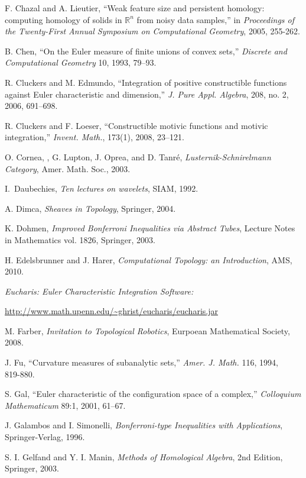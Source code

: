 \documentclass{psapm-l}
\theoremstyle{definition}
\theoremstyle{remark}
\numberwithin{equation}{section}
\begin{document}
{\begin{thebibliography}{A}
 F. Chazal and A. Lieutier, ``Weak feature size and persistent homology: computing homology of solids in ${{\mathbb R}}^n$ from noisy data samples,'' in {\em Proceedings of the Twenty-First Annual Symposium on Computational Geometry}, 2005, 255-262.

 B. Chen, ``On the Euler measure of finite unions of convex sets,'' {\em Discrete and Computational Geometry} 10, 1993, 79--93.

 R. Cluckers and M. Edmundo, ``Integration of positive constructible functions against Euler characteristic and dimension,'' {\em J. Pure Appl. Algebra}, 208, no. 2, 2006, 691--698.

 R. Cluckers and F. Loeser, ``Constructible motivic functions and motivic integration,'' {\em Invent. Math.}, 173(1), 2008, 23--121.

 O. Cornea, , G. Lupton, J. Oprea, and D. Tanr\'e, {\em Lusternik-Schnirelmann Category}, Amer. Math. Soc., 2003.

 I.~Daubechies, \emph{Ten lectures on wavelets}, SIAM, 1992.

 A. Dimca, {\em Sheaves in Topology}, Springer, 2004.

 K. Dohmen, {\em Improved Bonferroni Inequalities via Abstract Tubes}, Lecture Notes in Mathematics vol. 1826, Springer, 2003.

 H. Edelsbrunner and J. Harer, {\em Computational Topology: an Introduction}, AMS, 2010.

 {\em Eucharis: Euler Characteristic Integration Software:}

\url{http://www.math.upenn.edu/~ghrist/eucharis/eucharis.jar}

 M. Farber, {\em Invitation to Topological Robotics}, Eurpoean Mathematical Society, 2008.

 J. Fu, ``Curvature measures of subanalytic sets,'' {\em Amer. J. Math.} 116, 1994, 819-880.

 S. Gal, ``Euler characteristic of the configuration space of a complex,'' {\em Colloquium Mathematicum} 89:1, 2001, 61--67.

 J. Galambos and I. Simonelli, {\em Bonferroni-type Inequalities with Applications}, Springer-Verlag, 1996.

 S. I. Gelfand and Y. I. Manin, {\em Methods of Homological Algebra}, 2nd Edition, Springer, 2003.


\end{thebibliography}}
\end{document}
